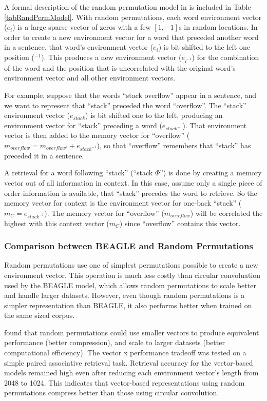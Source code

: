 \documentclass[man,floatsintext]{apa6}
\begin{document}
A formal description of the random permutation model in \textcite{Sahlgren2008} is included in Table \ref{tabRandPermModel}.
With random permutations, each word environment vector ($e_{i}$) is a large sparse vector of zeros with a few $[1,-1]$s in random locations. 
In order to create a new environment vector for a word that preceded another word in a sentence, that word's environment vector ($e_{i}$) is bit shifted to the left one position ($^{-1}$).
This produces a new environment vector ($e_{i^{-1}}$) for the combination of the word and the position that is uncorrelated with the original word's environment vector and all other environment vectors.

For example, suppose that the words ``stack overflow'' appear in a sentence, and we want to represent that ``stack'' preceded the word ``overflow''.
The ``stack'' environment vector ($e_{stack}$) is bit shifted one to the left, producing an environment vector for ``stack'' preceding a word ($e_{stack^{-1}}$).
That environment vector is then added to the memory vector for ``overflow'' ($m_{overflow} = m_{overflow'} + e_{stack^{-1}}$), so that ``overflow'' remembers that ``stack'' has preceded it in a sentence.

A retrieval for a word following ``stack'' (``stack $\Phi$'') is done by creating a memory vector out of all information in context.
In this case, assume only a single piece of order information is available, that ``stack'' precedes the word to retrieve.
So the memory vector for context is the environment vector for one-back ``stack'' ($m_{C} = e_{stack^{-1}}$).
The memory vector for ``overflow'' ($m_{overflow}$) will be correlated the highest with this context vector ($m_{C}$) since ``overflow'' contains this vector.

\subsubsection{Comparison between BEAGLE and Random Permutations}

Random permutations use one of simplest permutations possible to create a new environment vector.
This operation is much less costly than circular convoluation used by the BEAGLE model, which allows random permutations to scale better and handle larger datasets.
However, even though random permutations is a simpler representation than BEAGLE, it also performs better when trained on the same sized corpus. 

\textcite{Recchia2010} found that random permutations could use smaller vectors to produce equivalent performance (better compression), and scale to larger datasets (better computational efficiency).
The vector x performance tradeoff was tested on a simple paired associative retrieval task. 
Retrieval accuracy for the vector-based models remained high even after reducing each environment vector's length from \num{2048} to \num{1024}.
This indicates that vector-based representations using random permutations compress better than those using circular convolution.
\end{document}
